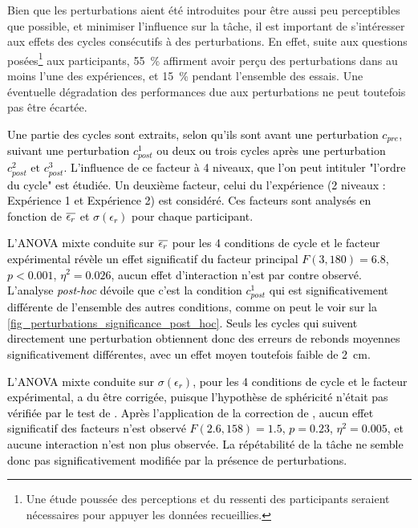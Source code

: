 Bien que les perturbations aient été introduites pour être aussi peu perceptibles que possible, et minimiser l'influence sur la tâche, il est important de s'intéresser aux effets des cycles consécutifs à des perturbations. En effet, suite aux questions posées\footnote{Une étude poussée des perceptions et du ressenti des participants seraient nécessaires pour appuyer les données recueillies.} aux participants, \SI{55}{\percent} affirment avoir perçu des perturbations dans au moins l'une des expériences, et \SI{15}{\percent} pendant l'ensemble des essais. Une éventuelle dégradation des performances due aux perturbations ne peut toutefois pas être écartée.%

\textcolor{black}{Une partie des cycles sont extraits, selon qu'ils sont avant une perturbation $c_{pre}$, suivant une perturbation $c_{post}^1$ ou deux ou trois cycles après une perturbation $c_{post}^2\text{ et }c_{post}^3$. L'influence de ce facteur à 4 niveaux, que l'on peut intituler "l'ordre du cycle" est étudiée. Un deuxième facteur, celui du l'expérience (2 niveaux : Expérience 1 et Expérience 2) est considéré. Ces facteurs sont analysés en fonction de $\overline{\epsilon_r}$ et $\sigma(\epsilon_r)$ pour chaque participant.}

\textcolor{black}{L'ANOVA mixte conduite sur $\overline{\epsilon_r}$ pour les 4 conditions de cycle et le facteur expérimental révèle un effet significatif du facteur principal $F(3, 180) = 6.8$, $p<0.001$,  $\eta^2 = 0.026$, aucun effet d'interaction n'est par contre observé. %
L'analyse \textit{post-hoc} dévoile que c'est la condition $c_{post}^1$ qui est significativement différente de l'ensemble des autres conditions, comme on peut le voir sur la \cref{fig_perturbations_significance_post_hoc}. Seuls les cycles qui suivent directement une perturbation obtiennent donc des erreurs de rebonds moyennes significativement différentes, avec un effet moyen toutefois faible de \SI{2}{\centi\meter}.}

\textcolor{black}{L'ANOVA mixte conduite sur $\sigma(\epsilon_r)$, pour les 4 conditions de cycle et le facteur expérimental, a du être corrigée, puisque l'hypothèse de sphéricité n'était pas vérifiée par le test de \textcite{mauchly_significance_1940}. Après l'application de la correction de \textcite{huynh_estimation_1976}, aucun effet significatif des facteurs n'est observé $F(2.6, 158) = 1.5$, $p=0.23$,  $\eta^2 = 0.005$, et aucune interaction n'est non plus observée. %
La répétabilité de la tâche ne semble donc pas significativement modifiée par la présence de perturbations.} %
	
